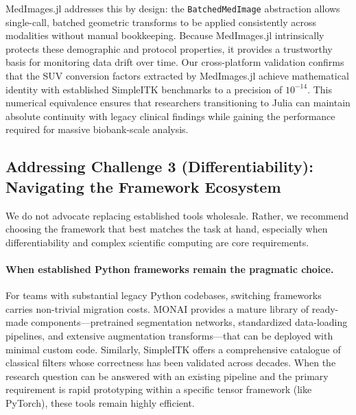 \documentclass[10pt,letterpaper]{article}
\begin{document}
MedImages.jl addresses this by design: the \texttt{BatchedMedImage} abstraction allows single-call, batched geometric transforms to be applied consistently across modalities without manual bookkeeping. Because MedImages.jl intrinsically protects these demographic and protocol properties, it provides a trustworthy basis for monitoring data drift over time. Our cross-platform validation confirms that the SUV conversion factors extracted by MedImages.jl achieve mathematical identity with established SimpleITK benchmarks to a precision of $10^{-14}$. This numerical equivalence ensures that researchers transitioning to Julia can maintain absolute continuity with legacy clinical findings while gaining the performance required for massive biobank-scale analysis.

\subsection*{Addressing Challenge 3 (Differentiability): Navigating the Framework Ecosystem}
We do not advocate replacing established tools wholesale. Rather, we recommend choosing the framework that best matches the task at hand, especially when differentiability and complex scientific computing are core requirements.

\paragraph{When established Python frameworks remain the pragmatic choice.}
For teams with substantial legacy Python codebases, switching frameworks carries non-trivial migration costs. MONAI provides a mature library of ready-made components---pretrained segmentation networks, standardized data-loading pipelines, and extensive augmentation transforms---that can be deployed with minimal custom code. Similarly, SimpleITK offers a comprehensive catalogue of classical filters whose correctness has been validated across decades. When the research question can be answered with an existing pipeline and the primary requirement is rapid prototyping within a specific tensor framework (like PyTorch), these tools remain highly efficient.
\end{document}

